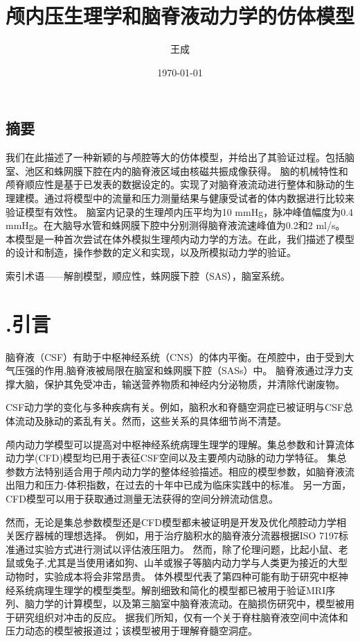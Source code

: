 \documentclass[12pt]{article}
\title{颅内压生理学和脑脊液动力学的仿体模型}
\author{王成}
\date{\today}
\begin{document}
\maketitle
\newpage


\begin{center}
    \section*{摘要}
\end{center}

我们在此描述了一种新颖的与颅腔等大的仿体模型，并给出了其验证过程。包括脑室、池区和蛛网膜下腔在内的脑脊液区域由核磁共振成像获得。
脑的机械特性和颅脊顺应性是基于已发表的数据设定的。实现了对脑脊液流动进行整体和脉动的生理建模。通过将模型中的流量和压力测量结果与健康受试者的体内数据进行比较来验证模型有效性。
脑室内记录的生理颅内压平均为10 mmHg，脉冲峰值幅度为0.4 mmHg。在大脑导水管和蛛网膜下腔中分别测得脑脊液流速峰值为0.2和2 ml/s。
本模型是一种首次尝试在体外模拟生理颅内动力学的方法。在此，我们描述了模型的设计和制造，操作参数的定义和实现，以及所模拟动力学的验证。

索引术语——解剖模型，顺应性，蛛网膜下腔（SAS），脑室系统。

\section*{\uppercase\expandafter{}.引言}

脑脊液（CSF）有助于中枢神经系统（CNS）的体内平衡。在颅腔中，由于受到大气压强的作用,脑脊液被局限在脑室和蛛网膜下腔（SASs）中。
脑脊液通过浮力支撑大脑，保护其免受冲击，输送营养物质和神经内分泌物质，并清除代谢废物。

CSF动力学的变化与多种疾病有关。例如，脑积水和脊髓空洞症已被证明与CSF总体流动及脉动的紊乱有关。然而，这些关系的具体细节尚不清楚。

颅内动力学模型可以提高对中枢神经系统病理生理学的理解。集总参数和计算流体动力学(CFD)模型均已用于表征CSF空间以及主要颅内动脉的动力学特征。
集总参数方法特别适合用于颅内动力学的整体经验描述。相应的模型参数，如脑脊液流出阻力和压力-体积指数，在过去的十年中已成为临床实践中的标准。
另一方面，CFD模型可以用于获取通过测量无法获得的空间分辨流动信息。

然而，无论是集总参数模型还是CFD模型都未被证明是开发及优化颅腔动力学相关医疗器械的理想选择。
例如，用于治疗脑积水的脑脊液分流器根据ISO 7197标准通过实验方式进行测试以评估液压阻力。
然而，除了伦理问题，比起小鼠、老鼠或兔子,尤其是当使用诸如狗、山羊或猴子等脑内动力学与人类更为接近的大型动物时，实验成本将会非常昂贵。
体外模型代表了第四种可能有助于研究中枢神经系统病理生理学的模型类型。解剖细致和简化的模型都已被用于验证MRI序列、脑力学的计算模型，以及第三脑室中脑脊液流动。在脑损伤研究中，模型被用于研究组织对冲击的反应。
据我们所知，仅有一个关于脊柱脑脊液空间中流体和压力动态的模型被报道过；该模型被用于理解脊髓空洞症。
\end{document}
